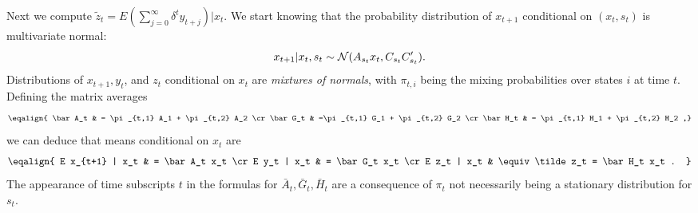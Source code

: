 Next we compute $ \tilde z_t =  E ( \sum_{j=0}^\infty \delta^t y_{t+j} ) | x_t$.
 We start knowing that the probability distribution of $x_{t+1}$  conditional on $(x_t, s_t)$ is multivariate normal:
$$  x_{t+1} | x_t, s_t   \sim {\cal N}( A_{s_t} x_t, C_{s_t}C_{s_t} ' ) . $$
Distributions of $x_{t+1}, y_t$, and $z_t$ conditional on $x_t$ are {\it mixtures of normals}, with $\pi_{t,i}$   being the mixing probabilities over states $i$  at time $t$.
Defining the matrix averages
$$ \eqalign{ \bar A_t & = \pi_{t,1} A_1 + \pi_{t,2} A_2   \cr
                    \bar G_t & =\pi_{t,1} G_1 + \pi_{t,2} G_2 \cr
                    \bar H_t & = \pi_{t,1} H_1 + \pi_{t,2} H_2  ,}$$
we can deduce that means  conditional on $x_t$ are 
$$ \eqalign{ E x_{t+1} | x_t & = \bar A_t x_t \cr
                    E y_t | x_t & = \bar G_t x_t      \cr
                    E z_t | x_t & \equiv \tilde z_t = \bar H_t x_t   . }$$
The appearance of  time subscripts $t$ in the formulas for $\bar A_t, \bar G_t, \bar H_t$ are a 
consequence of  $\pi_t$ not necessarily
being a stationary distribution for $s_t$. %

